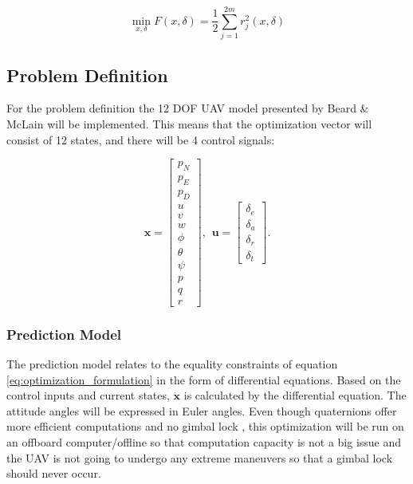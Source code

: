 \begin{equation}
	\label{eq:odr}
	\min_{x, \delta} F(x,\delta) = \frac{1}{2}\sum_{j=1}^{2m}r_j^2(x,\delta)
\end{equation}


\subsection{Problem Definition}

For the problem definition the 12 DOF UAV model presented by Beard \& McLain \cite{uavBEARD} will be implemented. This means that the optimization vector will consist of 12 states, and there will be 4 control signals:

\begin{equation}
	\mathbf{x} =
	\begin{bmatrix}
		p_N \\ p_E \\ p_D \\
		u \\ v \\ w \\
		\phi \\ \theta \\ \psi \\
		p \\ q \\ r
	\end{bmatrix}
	, \hspace{5pt} \mathbf{u} =
	\begin{bmatrix}
		\delta_e \\ \delta_a \\ \delta_r \\ \delta_t
	\end{bmatrix}.
\end{equation}


\subsubsection{Prediction Model}

The prediction model relates to the equality constraints of equation \ref{eq:optimization_formulation} in the form of differential equations. Based on the control inputs and current states, $\mathbf{\dot{x}}$ is calculated by the differential equation. The attitude angles will be expressed in Euler angles. Even though quaternions offer more efficient computations and no gimbal lock \cite{uavBEARD}, this optimization will be run on an offboard computer/offline so that computation capacity is not a big issue and the UAV is not going to undergo any extreme maneuvers so that a gimbal lock should never occur.


